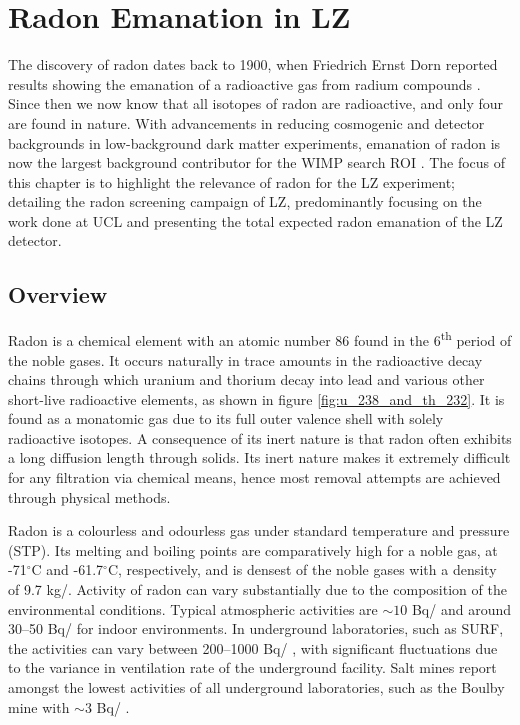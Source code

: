 \chapter{Radon Emanation in LZ}
\label{chap:chap4}

The discovery of radon dates back to 1900, when Friedrich Ernst Dorn reported results showing the emanation of a radioactive gas from radium compounds \cite{PARTINGTON1957}. Since then we now know that all isotopes of radon are radioactive, and only four are found in nature. With advancements in reducing cosmogenic and detector backgrounds in low-background dark matter experiments, emanation of radon is now the largest background contributor for the WIMP search ROI \cite{akerib2018projected}. The focus of this chapter is to highlight the relevance of radon for the LZ experiment; detailing the radon screening campaign of LZ, predominantly focusing on the work done at UCL and presenting the total expected radon emanation of the LZ detector.


\section{Overview}

Radon is a chemical element with an atomic number 86 found in the 6\textsuperscript{th} period of the noble gases. It occurs naturally in trace amounts in the radioactive decay chains through which uranium and thorium decay into lead and various other short-live radioactive elements, as shown in figure \ref{fig:u_238_and_th_232}. It is found as a monatomic gas due to its full outer valence shell with solely radioactive isotopes. A consequence of its inert nature is that radon often exhibits a long diffusion length through solids. Its inert nature makes it extremely difficult for any filtration via chemical means, hence most removal attempts are achieved through physical methods. 

Radon is a colourless and odourless gas under standard temperature and pressure (STP). Its melting and boiling points are comparatively high for a noble gas, at -71$^{\circ}$C and -61.7$^{\circ}$C, respectively, and is densest of the noble gases with a density of 9.7 kg/\cubicmeter{}. Activity of radon can vary substantially due to the composition of the environmental conditions. Typical atmospheric activities are $\sim10$ Bq/\cubicmeter{} and around 30--50 Bq/\cubicmeter{} for indoor environments. In underground laboratories, such as SURF, the activities can vary between 200--1000 Bq/\cubicmeter{} \cite{Heise_2015}, with significant fluctuations due to the variance in ventilation rate of the underground facility. Salt mines report amongst the lowest activities of all underground laboratories, such as the Boulby mine with $\sim3$ Bq/\cubicmeter{} \cite{scovell_boulby}. 

